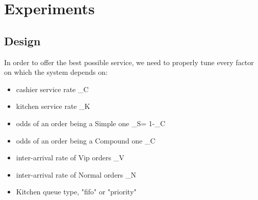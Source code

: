 \section{Experiments}

\subsection{Design}
In order to offer the best possible service, we need to properly tune every factor on which the system depends on:
\begin{itemize}
    \item cashier service rate \mu_C
    \item kitchen service rate \mu_K
    \item odds of an order being a Simple one \pi_S= 1-\pi_C 
    \item odds of an order being a Compound one \pi_C 
    \item inter-arrival rate of Vip orders \lambda_V
    \item inter-arrival rate of Normal orders \lambda_N
    \item Kitchen queue type, "fifo" or "priority"
\end{itemize}

